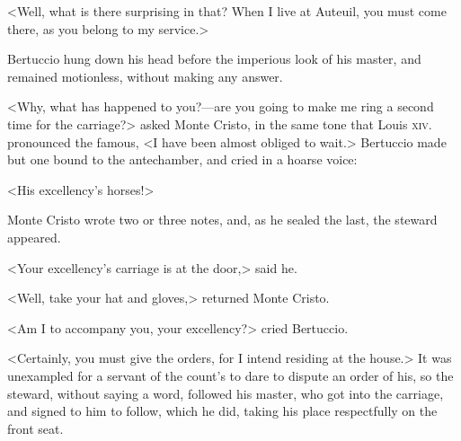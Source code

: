  <Well, what is there surprising in that? When I live at Auteuil, you must come there, as you belong to my service.> 

 Bertuccio hung down his head before the imperious look of his master, and remained motionless, without making any answer. 

 <Why, what has happened to you?—are you going to make me ring a second time for the carriage?> asked Monte Cristo, in the same tone that Louis \textsc{xiv.} pronounced the famous, <I have been almost obliged to wait.> Bertuccio made but one bound to the antechamber, and cried in a hoarse voice: 

 <His excellency's horses!> 

 Monte Cristo wrote two or three notes, and, as he sealed the last, the steward appeared. 

 <Your excellency's carriage is at the door,> said he. 

 <Well, take your hat and gloves,> returned Monte Cristo. 

 <Am I to accompany you, your excellency?> cried Bertuccio. 

 <Certainly, you must give the orders, for I intend residing at the house.>  It was unexampled for a servant of the count's to dare to dispute an order of his, so the steward, without saying a word, followed his master, who got into the carriage, and signed to him to follow, which he did, taking his place respectfully on the front seat. 